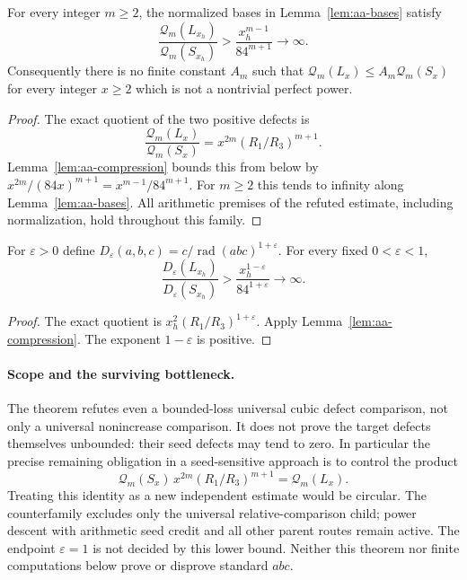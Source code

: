 \begin{theorem}
\label{thm:aa-amplification}
For every integer $m\ge2$, the normalized bases in
Lemma~\ref{lem:aa-bases} satisfy
\[
 \boxed{\quad
 \frac{\mathcal Q_m(L_{x_h})}{\mathcal Q_m(S_{x_h})}
 >\frac{x_h^{m-1}}{84^{m+1}}\longrightarrow\infty.
 \quad}
\]
Consequently there is no finite constant $A_m$ such that
$\mathcal Q_m(L_x)\le A_m\mathcal Q_m(S_x)$ for every integer
$x\ge2$ which is not a nontrivial perfect power.
\end{theorem}
\begin{proof}
The exact quotient of the two positive defects is
\[
 \frac{\mathcal Q_m(L_x)}{\mathcal Q_m(S_x)}
 =x^{2m}(R_1/R_3)^{m+1}.
\]
Lemma~\ref{lem:aa-compression} bounds this from below by
$x^{2m}/(84x)^{m+1}=x^{m-1}/84^{m+1}$. For $m\ge2$ this tends to
infinity along Lemma~\ref{lem:aa-bases}. All arithmetic premises of the
refuted estimate, including normalization, hold throughout this family.
\end{proof}

\begin{corollary}
\label{cor:aa-real-amplification}
For $\varepsilon>0$ define
$D_\varepsilon(a,b,c)=c/\operatorname{rad}(abc)^{1+\varepsilon}$.
For every fixed $0<\varepsilon<1$,
\[
 \frac{D_\varepsilon(L_{x_h})}{D_\varepsilon(S_{x_h})}
 >\frac{x_h^{1-\varepsilon}}{84^{1+\varepsilon}}
 \longrightarrow\infty.
\]
\end{corollary}
\begin{proof}
The exact quotient is $x_h^2(R_1/R_3)^{1+\varepsilon}$.
Apply Lemma~\ref{lem:aa-compression}. The exponent $1-\varepsilon$ is
positive.
\end{proof}

\paragraph{Scope and the surviving bottleneck.}
The theorem refutes even a bounded-loss universal cubic defect comparison,
not only a universal nonincrease comparison. It does not prove the target
defects themselves unbounded: their seed defects may tend to zero. In
particular the precise remaining obligation in a seed-sensitive approach is
to control the product
\[
 \mathcal Q_m(S_x)\,
 x^{2m}(R_1/R_3)^{m+1}
 =\mathcal Q_m(L_x).
\]
Treating this identity as a new independent estimate would be circular.
The counterfamily excludes only the universal relative-comparison child;
power descent with arithmetic seed credit and all other parent routes remain
active. The endpoint $\varepsilon=1$ is not decided by this lower bound.
Neither this theorem nor finite computations below prove or disprove standard
$abc$.

